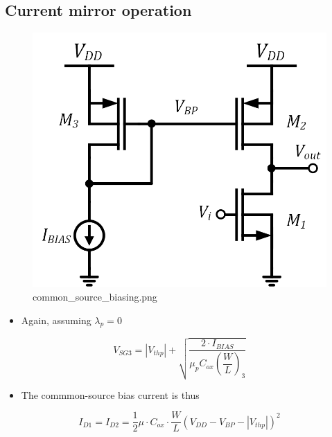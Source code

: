 \documentclass[11pt]{article}
\providecommand{\tightlist}{%
      \setlength{\itemsep}{0pt}\setlength{\parskip}{0pt}}
\begin{document}
    \hypertarget{current-mirror-operation}{%
\subsection{Current mirror operation}\label{current-mirror-operation}}

    \begin{figure}
\centering
\includegraphics{common_source_biasing.png}
\caption{common\_source\_biasing.png}
\end{figure}

    \begin{itemize}
\tightlist
\item
  Again, assuming \(\lambda_p = 0\)
\end{itemize}

\begin{equation}
V_{SG3} = |V_{thp}| + \sqrt{\dfrac{2\cdot I_{BIAS}}{\mu_pC_{ox} \left(\dfrac{W}{L}\right)_3}}
\end{equation}

\begin{itemize}
\tightlist
\item
  The commmon-source bias current is thus
\end{itemize}

\begin{equation}
I_{D1} = I_{D2} = \dfrac{1}{2}\mu\cdot C_{ox} \cdot \dfrac{W}{L}(V_{DD}-V_{BP}-|V_{thp}|)^2
\end{equation}
\end{document}
